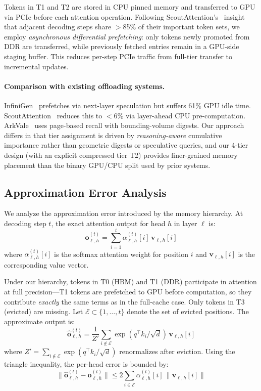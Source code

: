 \documentclass{article}
\begin{document}
Tokens in T1 and T2 are stored in CPU pinned memory and transferred to GPU via PCIe before each attention operation.
Following ScoutAttention's~\cite{scoutattention} insight that adjacent decoding steps share $>$85\% of their important token sets, we employ \emph{asynchronous differential prefetching}: only tokens newly promoted from DDR are transferred, while previously fetched entries remain in a GPU-side staging buffer.
This reduces per-step PCIe traffic from full-tier transfer to incremental updates.

\paragraph{Comparison with existing offloading systems.}
InfiniGen~\cite{infinigen} prefetches via next-layer speculation but suffers 61\% GPU idle time.
ScoutAttention~\cite{scoutattention} reduces this to $<$6\% via layer-ahead CPU pre-computation.
ArkVale~\cite{arkvale} uses page-based recall with bounding-volume digests.
Our approach differs in that tier assignment is driven by \emph{reasoning-aware} cumulative importance rather than geometric digests or speculative queries, and our 4-tier design (with an explicit compressed tier T2) provides finer-grained memory placement than the binary GPU/CPU split used by prior systems.

\subsection{Approximation Error Analysis}
\label{sec:error_analysis}

We analyze the approximation error introduced by the memory hierarchy.
At decoding step $t$, the exact attention output for head $h$ in layer $\ell$ is:
\begin{equation}
    \mathbf{o}_{\ell,h}^{(t)} = \sum_{i=1}^{t} \alpha_{\ell,h}^{(t)}[i] \, \mathbf{v}_{\ell,h}[i]
\end{equation}
where $\alpha_{\ell,h}^{(t)}[i]$ is the softmax attention weight for position $i$ and $\mathbf{v}_{\ell,h}[i]$ is the corresponding value vector.

Under our hierarchy, tokens in T0 (HBM) and T1 (DDR) participate in attention at full precision---T1 tokens are prefetched to GPU before computation, so they contribute \emph{exactly} the same terms as in the full-cache case.
Only tokens in T3 (evicted) are missing.
Let $\mathcal{E} \subset \{1, \ldots, t\}$ denote the set of evicted positions.
The approximate output is:
\begin{equation}
    \hat{\mathbf{o}}_{\ell,h}^{(t)} = \frac{1}{Z'} \sum_{i \notin \mathcal{E}} \exp(q^\top k_i / \sqrt{d}) \, \mathbf{v}_{\ell,h}[i]
\end{equation}
where $Z' = \sum_{i \notin \mathcal{E}} \exp(q^\top k_i / \sqrt{d})$ renormalizes after eviction.
Using the triangle inequality, the per-head error is bounded by:
\begin{equation}
    \|\hat{\mathbf{o}}_{\ell,h}^{(t)} - \mathbf{o}_{\ell,h}^{(t)}\| \leq 2 \sum_{i \in \mathcal{E}} \alpha_{\ell,h}^{(t)}[i] \, \|\mathbf{v}_{\ell,h}[i]\|
    \label{eq:error_bound}
\end{equation}
\end{document}
